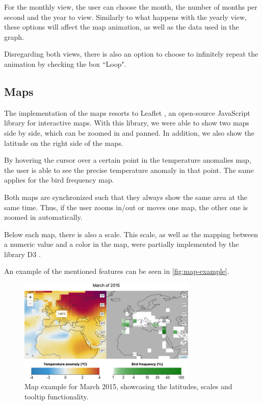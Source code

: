 \documentclass[journal]{vgtc}                %
\begin{document}
For the monthly view, the user can choose the month, the number of months per second and the year to view. Similarly to what happens with the yearly view, these options will affect the map animation, as well as the data used in the graph.

Disregarding both views, there is also an option to choose to infinitely repeat the animation by checking the box ``Loop".

\subsection{Maps}

The implementation of the maps resorts to Leaflet \cite{leaflet}, an open-source JavaScript library for interactive maps. With this library, we were able to show two maps side by side, which can be zoomed in and panned. In addition, we also show the latitude on the right side of the maps.

By hovering the cursor over a certain point in the temperature anomalies map, the user is able to see the precise temperature anomaly in that point. The same applies for the bird frequency map.

Both maps are synchronized such that they always show the same area at the same time. Thus, if the user zooms in/out or moves one map, the other one is zoomed in automatically.

Below each map, there is also a scale. This scale, as well as the mapping between a numeric value and a color in the map, were partially implemented by the library D3 \cite{d3js}.

An example of the mentioned features can be seen in \autoref{fig:map-example}.

\begin{figure}[h]
  \centering
  \includegraphics[width=85mm]{map-example}
  \caption{Map example for March 2015, showcasing the latitudes, scales and tooltip functionality.}
  \label{fig:map-example}
\end{figure}
\end{document}
